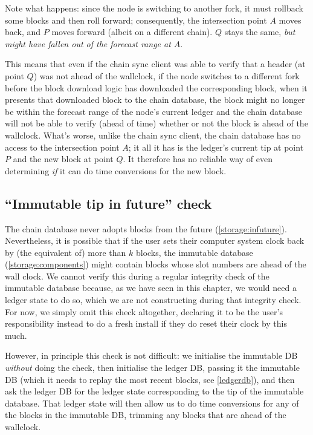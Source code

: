 Note what happens: since the node is switching to another fork, it must rollback
some blocks and then roll forward; consequently, the intersection point $A$
moves back, and $P$ moves forward (albeit on a different chain). $Q$ stays the
same, \emph{but might have fallen out of the forecast range at $A$}.

This means that even if the chain sync client was able to verify that a header
(at point $Q$) was not ahead of the wallclock, if the node switches to a
different fork before the block download logic has downloaded the corresponding
block, when it presents that downloaded block to the chain database, the block
might no longer be within the forecast range of the node's current ledger and
the chain database will not be able to verify (ahead of time) whether or not the
block is ahead of the wallclock. What's worse, unlike the chain sync client, the
chain database has no access to the intersection point $A$; it all it has is the
ledger's current tip at  point $P$ and the new block at point $Q$. It therefore
has no reliable way of even determining \emph{if} it can do time conversions for
the new block.

\subsection{``Immutable tip in future'' check}
\label{time:imm-tip-in-future}

The chain database never adopts blocks from the future
(\cref{storage:infuture}). Nevertheless, it is possible that if the user sets
their computer system clock back by (the equivalent of) more than $k$ blocks,
the immutable database (\cref{storage:components}) might contain blocks
whose slot numbers are ahead of the wall clock. We cannot verify this during a
regular integrity check of the immutable database because, as we have seen in
this chapter, we would need a ledger state to do so, which we are not
constructing during that integrity check. For now, we simply omit this check
altogether, declaring it to be the user's responsibility instead to do a
fresh install if they do reset their clock by this much.

However, in principle this check is not difficult: we initialise the immutable
DB \emph{without} doing the check, then initialise the ledger DB, passing it the
immutable DB (which it needs to replay the most recent blocks, see
\cref{ledgerdb}), and then ask the ledger DB for the ledger state
corresponding to the tip of the immutable database. That ledger state will then
allow us to do time conversions for any of the blocks in the immutable DB,
trimming any blocks that are ahead of the wallclock.

